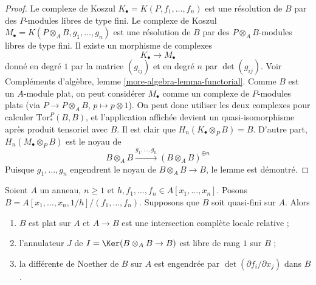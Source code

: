 \begin{proof}
Le complexe de Koszul $K_\bullet = K(P, f_1, \ldots, f_n)$ est une résolution
de $B$ par des $P$-modules libres de type fini. Le complexe de Koszul
$M_\bullet = K(P \otimes_A B, g_1, \ldots, g_n)$ est une résolution
de $B$ par des $P \otimes_A B$-modules libres de type fini. Il existe un morphisme de
complexes
$$
K_\bullet \longrightarrow M_\bullet
$$
donné en degré $1$ par la matrice $(g_{ij})$ et
en degré $n$ par $\det(g_{ij})$. Voir
Compléments d'algèbre, lemme \ref{more-algebra-lemma-functorial}.
Comme $B$ est un $A$-module plat, on peut considérer $M_\bullet$ comme un complexe
de $P$-modules plats (via $P \to P \otimes_A B$, $p \mapsto p \otimes 1$).
On peut donc utiliser les deux complexes pour calculer $\text{Tor}_*^P(B, B)$,
et l'application affichée devient un quasi-isomorphisme après produit tensoriel
avec $B$. Il est clair que $H_n(K_\bullet \otimes_P B) = B$.
D'autre part, $H_n(M_\bullet \otimes_P B)$ est le noyau de
$$
B \otimes_A B \xrightarrow{g_1, \ldots, g_n} (B \otimes_A B)^{\oplus n}
$$
Puisque $g_1, \ldots, g_n$ engendrent le noyau de $B \otimes_A B \to B$,
le lemme est démontré.
\end{proof}

\begin{lemma}
\label{lemma-quasi-finite-complete-intersection}
Soient $A$ un anneau, $n \geq 1$ et
$h, f_1, \ldots, f_n \in A[x_1, \ldots, x_n]$.
Posons $B = A[x_1, \ldots, x_n, 1/h]/(f_1, \ldots, f_n)$.
Supposons que $B$ soit quasi-fini sur $A$.
Alors
\begin{enumerate}
\item $B$ est plat sur $A$ et $A \to B$ est une intersection complète locale
relative ;
\item l'annulateur $J$ de $I = \Ker(B \otimes_A B \to B)$
est libre de rang $1$ sur $B$ ;
\item la différente de Noether de $B$ sur $A$ est engendrée
par $\det(\partial f_i/\partial x_j)$ dans $B$.
\end{enumerate}
\end{lemma}

